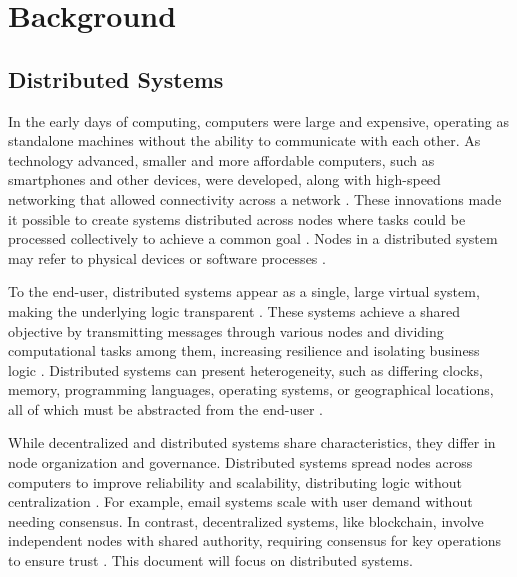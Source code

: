 
\chapter{Background} %

\label{chap:Chapter2} %


\section{Distributed Systems}

In the early days of computing, computers were large and expensive, operating as standalone machines without the ability to communicate with each other. As technology advanced, smaller and more affordable computers, such as smartphones and other devices, were developed, along with high-speed networking that allowed connectivity across a network \cite{Tanenbaum2023}. These innovations made it possible to create systems distributed across nodes where tasks could be processed collectively to achieve a common goal \cite{Sharma2016}. Nodes in a distributed system may refer to physical devices or software processes \cite{Vitillo2021}.

To the end-user, distributed systems appear as a single, large virtual system, making the underlying logic transparent \cite{Naik2021}. These systems achieve a shared objective by transmitting messages through various nodes and dividing computational tasks among them, increasing resilience and isolating business logic \cite{Lamport1978, Sari2015, Vitillo2021}. Distributed systems can present heterogeneity, such as differing clocks, memory, programming languages, operating systems, or geographical locations, all of which must be abstracted from the end-user \cite{Sari2015, Tanenbaum2023}.

While decentralized and distributed systems share characteristics, they differ in node organization and governance. Distributed systems spread nodes across computers to improve reliability and scalability, distributing logic without centralization \cite{Tanenbaum2023}. For example, email systems scale with user demand without needing consensus. In contrast, decentralized systems, like blockchain, involve independent nodes with shared authority, requiring consensus for key operations to ensure trust \cite{aws-decentralization,Tanenbaum2023}. This document will focus on distributed systems.

